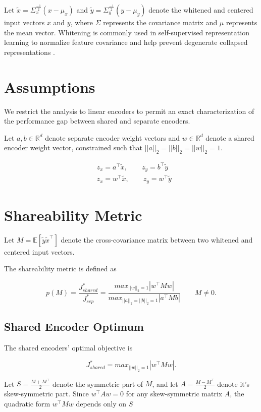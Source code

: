 \documentclass{article}
\begin{document}
Let \(\tilde{x} = \Sigma_x^\frac{-1}{2}(x - \mu_x)\) and \(\tilde{y} = \Sigma_y^\frac{-1}{2}(y - \mu_y)\) denote the whitened and centered input vectors \(x\) and \(y\), where \(\Sigma\) represents the covariance matrix and \(\mu\) represents the mean vector. Whitening is commonly used in self-supervised representation learning to normalize feature covariance and help prevent degenerate collapsed representations \cite{pmlr-v139-ermolov21a}.

\section{Assumptions}
We restrict the analysis to linear encoders to permit an exact characterization of the performance gap between shared and separate encoders.

Let \(a, b \in \mathbb{R}^d\) denote separate encoder weight vectors and \(w \in \mathbb{R}^d\) denote a shared encoder weight vector, constrained such that \(||a||_2 = ||b||_2 = ||w||_2 = 1\).

\[
\begin{aligned}
&z_x = a^\top \tilde{x}, \qquad z_y = b^\top \tilde{y} \\
&z_x = w^\top \tilde{x}, \qquad z_y = w^\top \tilde{y}
\end{aligned}
\]

\section{Shareability Metric}

Let \(M = \mathbb{E}[\tilde{y} \tilde{x}^\top]\) denote the cross-covariance matrix between two whitened and centered input vectors. 

The shareability metric is defined as

\[
p(M) = \frac{J_{shared}^*}{J_{sep}^*} = \frac{max_{||w||_2=1}|w^\top M w|}{max_{||a||_2 = ||b||_2 = 1} |a^\top M b|} \qquad M \neq 0.
\]

\subsection{Shared Encoder Optimum}

The shared encoders' optimal objective is

\[
J_{shared}^* = max_{||w||_2=1}|w^\top M w|.
\]

Let \(S = \frac{M +  M^\top}{2}\) denote the symmetric part of \(M\), and let \(A = \frac{M - M^\top}{2}\) denote it's skew-symmetric part. Since \(w^\top A w = 0\) for any skew-symmetric matrix \(A\), the quadratic form \(w^\top M w\) depends only on \(S\)
\end{document}
